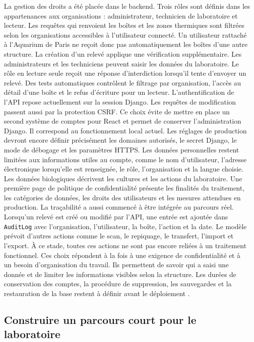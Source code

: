 \documentclass{article}
\begin{document}
La gestion des droits a été placée dans le backend. Trois rôles sont définis dans les appartenances aux organisations : administrateur, technicien de laboratoire et lecteur. Les requêtes qui renvoient les boîtes et les zones thermiques sont filtrées selon les organisations accessibles à l’utilisateur connecté. Un utilisateur rattaché à l’Aquarium de Paris ne reçoit donc pas automatiquement les boîtes d’une autre structure.
La création d’un relevé applique une vérification supplémentaire. Les administrateurs et les techniciens peuvent saisir les données du laboratoire. Le rôle en lecture seule reçoit une réponse d’interdiction lorsqu’il tente d’envoyer un relevé. Des tests automatiques contrôlent le filtrage par organisation, l’accès au détail d’une boîte et le refus d’écriture pour un lecteur.
L’authentification de l’API repose actuellement sur la session Django. Les requêtes de modification passent aussi par la protection CSRF. Ce choix évite de mettre en place un second système de comptes pour React et permet de conserver l’administration Django. Il correspond au fonctionnement local actuel. Les réglages de production devront encore définir précisément les domaines autorisés, le secret Django, le mode de débogage et les paramètres HTTPS.
Les données personnelles restent limitées aux informations utiles au compte, comme le nom d’utilisateur, l’adresse électronique lorsqu’elle est renseignée, le rôle, l’organisation et la langue choisie. Les données biologiques décrivent les cultures et les actions du laboratoire. Une première page de politique de confidentialité présente les finalités du traitement, les catégories de données, les droits des utilisateurs et les mesures attendues en production.
La traçabilité a aussi commencé à être intégrée au parcours réel. Lorsqu’un relevé est créé ou modifié par l’API, une entrée est ajoutée dans \texttt{AuditLog} avec l’organisation, l’utilisateur, la boîte, l’action et la date. Le modèle prévoit d’autres actions comme le scan, le repiquage, le transfert, l’import et l’export. À ce stade, toutes ces actions ne sont pas encore reliées à un traitement fonctionnel.
Ces choix répondent à la fois à une exigence de confidentialité et à un besoin d’organisation du travail. Ils permettent de savoir qui a saisi une donnée et de limiter les informations visibles selon la structure. Les durées de conservation des comptes, la procédure de suppression, les sauvegardes et la restauration de la base restent à définir avant le déploiement \cite{cnil-principes,cnil-conservation}.

\subsection{Construire un parcours court pour le laboratoire}
\end{document}
